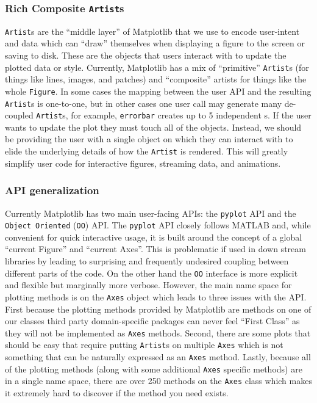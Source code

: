 \documentclass[11pt]{article}  %
\begin{document}
\subsubsection{Rich Composite \texttt{Artist}s}

\texttt{Artist}s are the ``middle layer'' of Matplotlib that we use to
encode user-intent and data which can ``draw'' themselves when
displaying a figure to the screen or saving to disk.  These are the
objects that users interact with to update the plotted data or style.
Currently, Matplotlib has a mix of ``primitive'' \texttt{Artist}s (for
things like lines, images, and patches) and ``composite'' artists for
things like the whole \texttt{Figure}.  In some cases the mapping
between the user API and the resulting \texttt{Artist}s is one-to-one,
but in other cases one user call may generate many de-coupled
\texttt{Artist}s, for example, \texttt{errorbar} creates up to 5
independent s.  If the user wants to update the plot
they must touch all of the objects.  Instead, we should be providing
the user with a single object on which they can interact with to elide
the underlying details of how the \texttt{Artist} is rendered.  This
will greatly simplify user code for interactive figures, streaming
data, and animations.


\subsubsection{API generalization}

Currently Matplotlib has two main user-facing APIs: the
\texttt{pyplot} API and the \texttt{Object Oriented} (\texttt{OO})
API.  The \texttt{pyplot} API closely follows MATLAB and, while
convenient for quick interactive usage, it is built around the concept
of a global ``current Figure'' and ``current Axes''.  This is
problematic if used in down stream libraries by leading to surprising
and frequently undesired coupling between different parts of the code.
On the other hand the \texttt{OO} interface is more explicit and
flexible but marginally more verbose.  However, the main name space
for plotting methods is on the \texttt{Axes} object which leads to
three issues with the API.  First because the plotting methods
provided by Matplotlib are methods on one of our classes third party
domain-specific packages can never feel ``First Class'' as they will
not be implemented as \texttt{Axes} methods.  Second, there are some
plots that should be easy that require putting \texttt{Artist}s on
multiple \texttt{Axes} which is not something that can be naturally
expressed as an \texttt{Axes} method.  Lastly, because all of the
plotting methods (along with some additional \texttt{Axes} specific
methods) are in a single name space, there are over 250 methods on the
\texttt{Axes} class which makes it extremely hard to discover if the
method you need exists.
\end{document}
